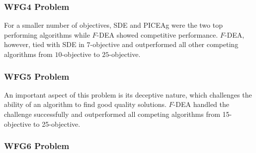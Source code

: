 \documentclass[review]{elsarticle}
\begin{document}
\subsubsection{WFG4 Problem}
%

For a smaller number of objectives, SDE and PICEAg were the two top performing algorithms while $F$-DEA showed competitive performance.  $F$-DEA, however, tied with SDE in $7$-objective and outperformed all other competing algorithms from $10$-objective to $25$-objective. %

\subsubsection{WFG5 Problem}

An important aspect of this problem is its deceptive nature, which challenges the ability of an algorithm to find good quality solutions. $F$-DEA handled the challenge successfully and outperformed all competing algorithms from 15-objective to 25-objective. 

%

\subsubsection{WFG6 Problem}
\end{document}
